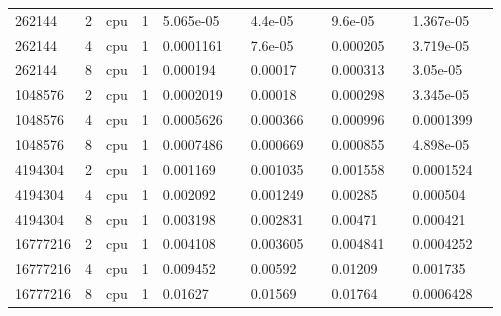 \begin{tabular}{llllllllllll}
262144 & 2 & cpu & 1 & 5.065e-05 &  & 4.4e-05 &  & 9.6e-05 &  & 1.367e-05 &  \\
262144 & 4 & cpu & 1 & 0.0001161 &  & 7.6e-05 &  & 0.000205 &  & 3.719e-05 &  \\
262144 & 8 & cpu & 1 & 0.000194 &  & 0.00017 &  & 0.000313 &  & 3.05e-05 &  \\
1048576 & 2 & cpu & 1 & 0.0002019 &  & 0.00018 &  & 0.000298 &  & 3.345e-05 &  \\
1048576 & 4 & cpu & 1 & 0.0005626 &  & 0.000366 &  & 0.000996 &  & 0.0001399 &  \\
1048576 & 8 & cpu & 1 & 0.0007486 &  & 0.000669 &  & 0.000855 &  & 4.898e-05 &  \\
4194304 & 2 & cpu & 1 & 0.001169 &  & 0.001035 &  & 0.001558 &  & 0.0001524 &  \\
4194304 & 4 & cpu & 1 & 0.002092 &  & 0.001249 &  & 0.00285 &  & 0.000504 &  \\
4194304 & 8 & cpu & 1 & 0.003198 &  & 0.002831 &  & 0.00471 &  & 0.000421 &  \\
16777216 & 2 & cpu & 1 & 0.004108 &  & 0.003605 &  & 0.004841 &  & 0.0004252 &  \\
16777216 & 4 & cpu & 1 & 0.009452 &  & 0.00592 &  & 0.01209 &  & 0.001735 &  \\
16777216 & 8 & cpu & 1 & 0.01627 &  & 0.01569 &  & 0.01764 &  & 0.0006428 &  \\
\hline
\end{tabular}

